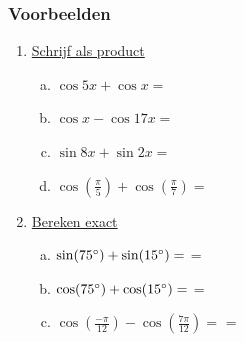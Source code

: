 \documentclass[a4paper,12pt]{article}
\begin{document}
\subsubsection*{Voorbeelden}

\begin{enumerate}[(1)]
  \item\underline{Schrijf als product}
    \begin{enumerate}[(a)]
      \item $\cos5x+\cos x=$ \dotfill
      \item $\cos x-\cos17x=$ \dotfill
      \item $\sin8x+\sin2x=$ \dotfill
      \item $\cos(\frac{\pi}{5})+\cos(\frac{\pi}{7})=$ \dotfill
    \end{enumerate}
  \item \underline{Bereken exact}
    \begin{enumerate}[(a)]
      \item $\sin(75^\circ)+\sin(15^\circ) =$ \dotfill \newline =\dotfill
      \item $\cos(75^\circ)+\cos(15^\circ) =$ \dotfill \newline =\dotfill
      \item $\cos(\frac{-\pi}{12})-\cos(\frac{7\pi}{12}) =$ \dotfill \newline =\dotfill
    \end{enumerate}
\end{enumerate}

\end{document}
